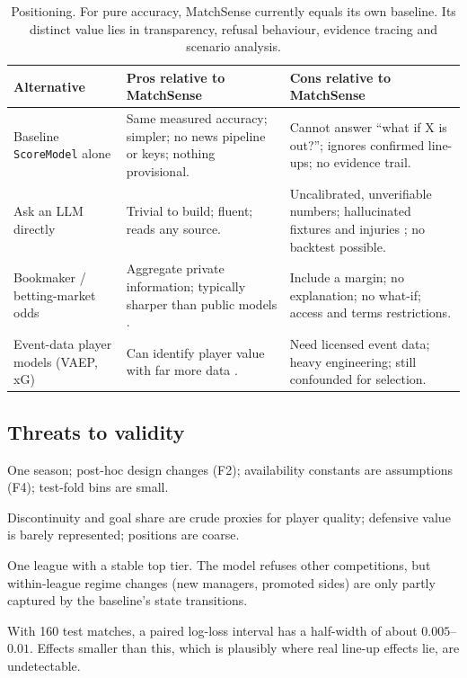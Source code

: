 \documentclass[11pt,a4paper]{article}
\newcommand{\code}[1]{\texttt{\small #1}}
\begin{document}
\begin{table}[h]
\centering\small
\begin{tabularx}{\linewidth}{@{}l>{\raggedright\arraybackslash}X>{\raggedright\arraybackslash}X@{}}
\toprule
Alternative & Pros relative to MatchSense & Cons relative to MatchSense\\
\midrule
Baseline \code{ScoreModel} alone & Same measured accuracy; simpler; no news pipeline or keys; nothing provisional. & Cannot answer ``what if X is out?''; ignores confirmed line-ups; no evidence trail. \\
Ask an LLM directly & Trivial to build; fluent; reads any source. & Uncalibrated, unverifiable numbers; hallucinated fixtures and injuries \citep{ji2023}; no backtest possible. \\
Bookmaker / betting-market odds & Aggregate private information; typically sharper than public models \citep{dixon1997}. & Include a margin; no explanation; no what-if; access and terms restrictions. \\
Event-data player models (VAEP, xG) & Can identify player value with far more data \citep{decroos2019}. & Need licensed event data; heavy engineering; still confounded for selection. \\
\bottomrule
\end{tabularx}
\caption{Positioning. For pure accuracy, MatchSense currently equals its own
baseline. Its distinct value lies in transparency, refusal behaviour,
evidence tracing and scenario analysis.}
\label{tab:proscons}
\end{table}

\subsection{Threats to validity}
\begin{description}[style=unboxed,leftmargin=0pt]
  \item[Internal.] One season; post-hoc design changes (F2); availability
        constants are assumptions (F4); test-fold bins are small.
  \item[Construct.] Discontinuity and goal share are crude proxies for player
        quality; defensive value is barely represented; positions are coarse.
  \item[External.] One league with a stable top tier. The model refuses other
        competitions, but within-league regime changes (new managers, promoted
        sides) are only partly captured by the baseline's state transitions.
  \item[Conclusion.] With 160 test matches, a paired log-loss interval has a
        half-width of about $0.005$--$0.01$. Effects smaller than this, which
        is plausibly where real line-up effects lie, are undetectable.
\end{description}
\end{document}
